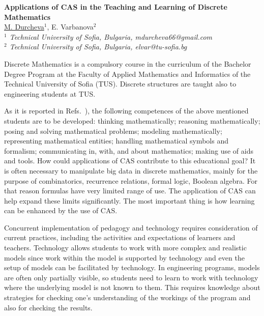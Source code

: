 \documentclass[11pt]{article}
\begin{document}
%
\vspace{-0.8cm}
\begin{flushleft}
\Large \textbf{\noindent
Applications of  CAS  in the Teaching and Learning of Discrete Mathematics}
\\
\vspace{0.5cm}
\normalsize
\normalsize{
 \underline{M. Durcheva}$^1$, E. Varbanova$^2$
} \\
\vspace{5mm}
\textit{\footnotesize
$^1$ Technical University of Sofia, Bulgaria,
mdurcheva66@gmail.com\\
$^2$ Technical University of Sofia, Bulgaria,
elvar@tu-sofia.bg\\
}
\end{flushleft}

      Discrete Mathematics is a compulsory course in the curriculum of the Bachelor Degree Program at the Faculty of Applied Mathematics and Informatics of the Technical University of Sofia (TUS). Discrete structures are taught also to engineering students at TUS.

As it is reported in  Refs.~\cite{FRAM,NISS}), the following competences of the above mentioned students are to be developed: thinking mathematically; reasoning mathematically; posing and solving mathematical problems; modeling mathematically; representing mathematical entities; handling mathematical symbols and formalism; communicating in, with, and about mathematics; making use of aids and tools. How could applications of CAS contribute to this educational goal?
It is often necessary to manipulate big data in discrete mathematics, mainly for the purpose of combinatorics, recurrence relations, formal logic, Boolean algebra. For that reason formulas have very limited range of use.  The application of CAS can help expand these limits significantly. The most important thing is how learning can be enhanced by the use of CAS.

 Concurrent implementation of pedagogy and technology requires consideration of current practices, including the activities and expectations of learners and teachers. Technology allows students to work with more complex and realistic models since work within the model is supported by technology and even the setup of models can be facilitated by technology. In engineering programs, models are often only partially visible, so students need to learn to work with technology where the underlying model is not known to them. This requires knowledge about strategies for checking one's understanding of the workings of the program and also for checking the results.
\end{document}
